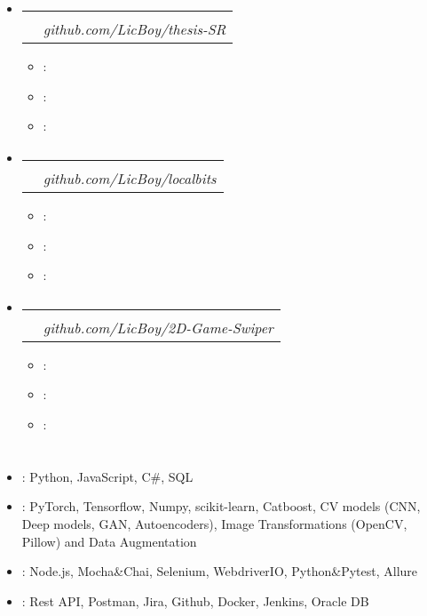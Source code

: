 \documentclass[12pt, letterpaper]{article}
\makeatletter
\newcommand{\resumeItem}[2]{
  \item\small{
    \textbf{#1}{: #2 \vspace{-2pt}}
  }
}
\newcommand{\resumeSubheading}[4]{
  \vspace{-1pt}\item
    \begin{tabular*}{0.97\textwidth}{l@{\extracolsep{\fill}}r}
      \textbf{#1} & #2 \\
      \textit{\small#3} & \textit{\small #4} \\
    \end{tabular*}\vspace{-5pt}
}
\newcommand{\resumeSubHeadingListStart}{\begin{itemize}[leftmargin=*]}
\newcommand{\resumeSubHeadingListEnd}{\end{itemize}}
\newcommand{\resumeItemListStart}{\begin{itemize}}
\newcommand{\resumeItemListEnd}{\end{itemize}\vspace{-5pt}}
\makeatother
\begin{document}
\section{\projectsWord}
   \resumeSubHeadingListStart
    \resumeSubheading
      {\projectFirstName}{\textit{\projectFirstDate}}
      {\projectPositionCreator}{github.com/LicBoy/thesis-SR}
      \resumeItemListStart
        \resumeItem{\projectFirstTitleFirst}{\projectFirstDescFirst}
        \resumeItem{\projectFirstTitleSecond}{\projectFirstDescSecond}
        \resumeItem{\projectFirstTitleThird}{\projectFirstDescThird}
      \resumeItemListEnd

    \resumeSubheading
      {\projectSecondName}{\textit{\projectSecondDate}}
      {\projectPositionCreator}{github.com/LicBoy/localbits}
      \resumeItemListStart
        \resumeItem{\projectSecondTitleFirst}{\projectSecondDescFirst}
        \resumeItem{\projectSecondTitleSecond}{\projectSecondDescSecond}
        \resumeItem{\projectSecondTitleThird}{\projectSecondDescThird}
      \resumeItemListEnd

    \resumeSubheading
      {\projectThirdName}{\textit{\projectThirdDate}}
      {\projectPositionCreator}{github.com/LicBoy/2D-Game-Swiper}
      \resumeItemListStart
        \resumeItem{\projectThirdTitleFirst}{\projectThirdDescFirst}
        \resumeItem{\projectThirdTitleSecond}{\projectThirdDescSecond}
        \resumeItem{\projectThirdTitleThird}{\projectThirdDescThird}
      \resumeItemListEnd
  \resumeSubHeadingListEnd

%
\section{\skillsWord}
 \resumeSubHeadingListStart
   \item{
        \textbf{\skillProgLanguages}{: Python, JavaScript, C\#, SQL}
    }
    \item{
        \textbf{\skillMachineLearning}{: PyTorch, Tensorflow, Numpy, scikit-learn, Catboost, CV models (CNN, Deep models, GAN, Autoencoders), Image Transformations (OpenCV, Pillow) and Data Augmentation}
    }
    \item{
        \textbf{\skillAutoTesting}{: Node.js, Mocha\&Chai, Selenium, WebdriverIO, Python\&Pytest, Allure}
    }
    \item{
        \textbf{\skillTools}{: Rest API, Postman, Jira, Github, Docker, Jenkins, Oracle DB}
    }
 \resumeSubHeadingListEnd


\end{document}

